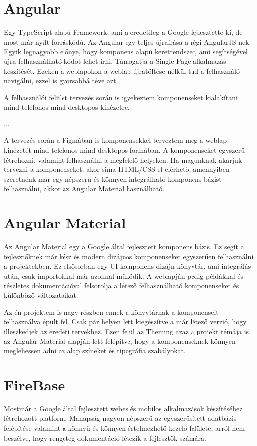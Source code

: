 \documentclass[12pt]{report}
\theoremstyle{definition}
\begin{document}
\section{Angular}
Egy TypeScript alapú Framework, ami a eredetileg a Google fejlesztette ki, de most már nyílt forráskódú. Az Angular egy teljes újraírása a régi AngularJS-nek. Egyik legnagyobb előnye, hogy komponens alapú keretrendszer, ami segítségével újra felhasználható kódot lehet írni. Támogatja a Single Page alkalmazás készítését. Ezeken a weblapokon a weblap újratöltése nélkül tud a felhasználó navigálni, ezzel is gyorsabbá téve azt.

A felhasználói felület tervezés során is igyekeztem komponenseket kialakítani mind telefonos mind desktopos kinézetre.

...

A tervezés során a Figmában is komponensekkel terveztem meg a weblap kinézetét mind telefonos mind desktopos formában. A komponenseket egyszerű létrehozni, valamint felhasználni a megfelelő helyeken. Ha magunknak akarjuk tervezni a komponenseket, akor sima HTML/CSS-el elérhető, amennyiben szeretnénk már egy népszerű és könnyen integrálható komponens bázist felhasználni, akkor az Angular Material használható.

\section{Angular Material}
Az Angular Material egy a Google által fejlesztett komponens bázis. Ez segít a fejlesztőknek már kész és modern dizájnos komponenseket egyszerűen felhasználni a projektekben. Ez elsősorban egy UI komponens dizájn könyvtár, ami integrálás után, csak importokkal már azonnal működik. A weblapján pedig példákkal és részletes dokumentációval felsorolja a létező felhasználható komponenseket és különböző változataikat.

Az én projektem is nagy részben ennek a könyvtárnak a komponenseit felhasználva épült fel. Csak pár helyen lett kiegészítve a már létező verzió, hogy illeszkedjek az eredeti tervekhez. Ezen felül az Theming azaz a projekt témája is az Angular Material alapján lett felépítve, hogy a komponenseknek könnyen meglehessen adni az alap színeket és tipográfia szabályokat.

\section{FireBase}
Mostmár a Google által fejlesztett webes és mobilos alkalmazások készítéséhez létrehozott platform. Manapság nagyon népszerű az egyszerűsített adatbázis felépítése valamint a könnyű és könnyen értelmezhető kezelő felülete, arról nem beszélve, hogy rengeteg dokumentáció létezik a fejlesztők számára.
\end{document}
